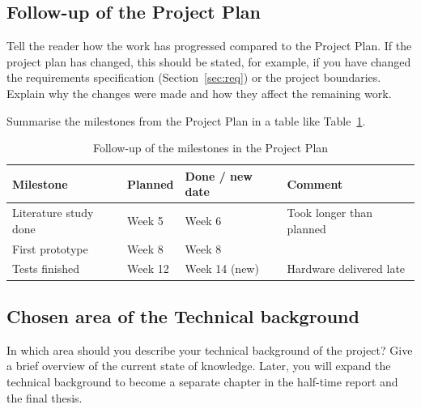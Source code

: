 \begin{onlymidterm}
\section{Follow-up of the Project Plan}
\label{sec:planfollowup}
\begin{instructions}
Tell the reader how the work has progressed compared to the Project Plan. If the project plan has changed, this should be stated, for example, if you have changed the requirements specification (Section~\ref{sec:req}) or the project boundaries. Explain why the changes were made and how they affect the remaining work.

Summarise the milestones from the Project Plan in a table like Table~\ref{tab:followup}.

\begin{table}[ht]
  \centering
  \caption{Follow-up of the milestones in the Project Plan}
  \label{tab:followup}
  \begin{tabular}{llll}
    \toprule
    Milestone & Planned & Done / new date & Comment \\
    \midrule
    Literature study done & Week 5 & Week 6 & Took longer than planned \\
    First prototype & Week 8 & Week 8 & \\
    Tests finished & Week 12 & Week 14 (new) & Hardware delivered late \\
    \bottomrule
  \end{tabular}
\end{table}
\end{instructions}
\end{onlymidterm}

\begin{onlyplan}
\section{Chosen area of the Technical background}
\label{sec:chosentechbg}
\begin{instructions}
In which area should you describe your technical background of the project? Give a brief overview of the current state of knowledge. Later, you will expand the technical background to become a separate chapter in the half-time report and the final thesis.
\end{instructions}
\end{onlyplan}


